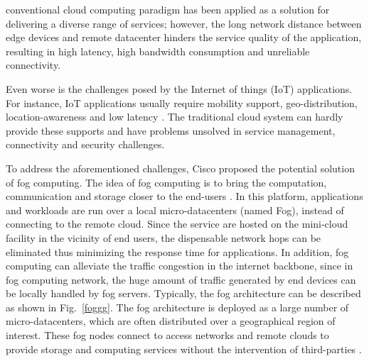 \documentclass[10pt,journal,compsoc]{IEEEtran}
\newcommand{\Fig}[1]{Fig.~\ref{#1}}
\begin{document}
% 
% 
% 
% 
 conventional cloud computing paradigm has been applied as a solution for delivering a diverse range of services; however, the long network distance between edge devices and remote datacenter hinders the service quality of the application, resulting in high latency, high bandwidth consumption and unreliable connectivity\cite{Vaquero:2014:FYW:2677046.2677052}. 

Even worse is the challenges posed by the Internet of things (IoT) applications. For instance, IoT applications usually require mobility support, geo-distribution, location-awareness and low latency \cite{bonomi2014fog}. The traditional cloud system can hardly provide these supports and have problems unsolved in service management, connectivity and security challenges\cite{yi2015survey}. 

To address the aforementioned challenges, Cisco proposed the potential solution of fog computing. The idea of fog computing is to bring the computation, communication and storage closer to the end-users \cite{yi2015survey}. In this platform, applications and workloads are run over a local micro-datacenters (named Fog), instead of connecting to the remote cloud. Since the service are hosted on the mini-cloud facility in the vicinity of end users, the dispensable network hops can be eliminated thus minimizing the response time for applications. In addition, fog computing can alleviate the traffic congestion in the internet backbone, since in fog computing network, the huge amount of traffic generated by end devices can be locally handled by fog servers. Typically, the fog architecture can be described as shown in \Fig{foggg}. The fog architecture is deployed as a large number of micro-datacenters, which are often distributed over a geographical region of interest. These fog nodes connect to access networks and remote clouds to provide storage and computing services without the intervention of third-parties \cite{chiang2016fog}.
\end{document}
